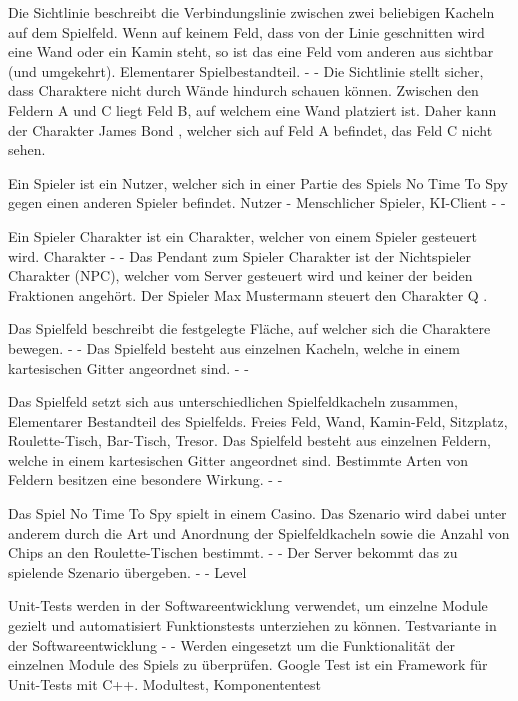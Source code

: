 {Die Sichtlinie beschreibt die Verbindungslinie zwischen zwei beliebigen Kacheln auf dem Spielfeld. Wenn auf keinem Feld, dass von der Linie geschnitten wird eine Wand oder ein Kamin steht, so ist das eine Feld vom anderen aus sichtbar (und umgekehrt).}
{Elementarer Spielbestandteil.}
{-}
{-}
{Die Sichtlinie stellt sicher, dass Charaktere nicht durch Wände hindurch schauen können.}
{Zwischen den Feldern A und C liegt Feld B, auf welchem eine Wand platziert ist. Daher kann der Charakter \glqq{}James Bond\grqq{} , welcher sich auf Feld A befindet, das Feld C nicht sehen.}

{Ein Spieler ist ein Nutzer, welcher sich in einer Partie des Spiels \glqq{}No Time To Spy\grqq{} gegen einen anderen Spieler befindet.}
{Nutzer}
{-}
{Menschlicher Spieler, KI-Client}
{-}
{-}

{Ein Spieler Charakter ist ein Charakter, welcher von einem Spieler gesteuert wird.}
{Charakter}
{-}
{-}
{Das Pendant zum Spieler Charakter ist der Nichtspieler Charakter (NPC), welcher vom Server gesteuert wird und keiner der beiden Fraktionen angehört.}
{Der Spieler \glqq{}Max Mustermann\grqq{} steuert den Charakter \glqq{} Q\grqq{} .}

{Das Spielfeld beschreibt die festgelegte Fläche, auf welcher sich die Charaktere bewegen.}
{-}
{-}
{Das Spielfeld besteht aus einzelnen Kacheln, welche in einem kartesischen Gitter angeordnet sind.}
{-}
{-}

{Das Spielfeld setzt sich aus unterschiedlichen Spielfeldkacheln zusammen, }
{Elementarer Bestandteil des Spielfelds.}
{Freies Feld, Wand, Kamin-Feld, Sitzplatz, Roulette-Tisch, Bar-Tisch, Tresor.}
{Das Spielfeld besteht aus einzelnen Feldern, welche in einem kartesischen Gitter angeordnet sind.}
{Bestimmte Arten von Feldern besitzen eine besondere Wirkung.}
{-}
{-}

{Das Spiel \glqq{}No Time To Spy\grqq{} spielt in einem Casino. Das Szenario wird dabei unter anderem durch die Art und Anordnung der Spielfeldkacheln sowie die Anzahl von Chips an den Roulette-Tischen bestimmt. }
{-}
{-}
{Der Server bekommt das zu spielende Szenario übergeben.}
{-}
{-}
{Level}

{Unit-Tests werden in der Softwareentwicklung verwendet, um einzelne Module gezielt und automatisiert Funktionstests unterziehen zu können.}
{Testvariante in der Softwareentwicklung}
{-}
{-}
{Werden eingesetzt um die Funktionalität der einzelnen Module des Spiels zu überprüfen.}
{Google Test ist ein Framework für Unit-Tests mit C++.}
{Modultest, Komponententest}

